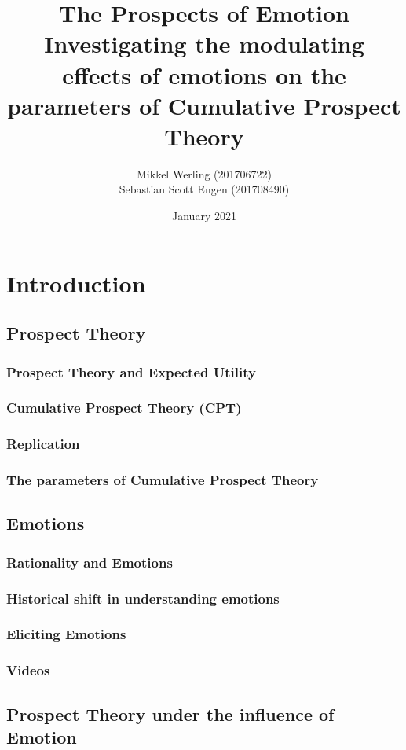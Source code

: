 \documentclass{article}
\title{The Prospects of Emotion \\
\large Investigating the modulating effects of emotions on the parameters of Cumulative Prospect Theory
}
\author{Mikkel Werling (201706722) \\ Sebastian Scott Engen (201708490)}
\date{January 2021}
\begin{document}
    \maketitle
    \tableofcontents
    \section{Introduction}
    \subsection{Prospect Theory}
    \subsubsection{Prospect Theory and Expected Utility}
    \subsubsection{Cumulative Prospect Theory (CPT)}
    \subsubsection{Replication}
    \subsubsection{The parameters of Cumulative Prospect Theory}
    \subsection{Emotions}
    \subsubsection{Rationality and Emotions}
    \subsubsection{Historical shift in understanding emotions}
    \subsubsection{Eliciting Emotions}
    \subsubsection{Videos}
    \subsection{Prospect Theory under the influence of Emotion}
\end{document}
